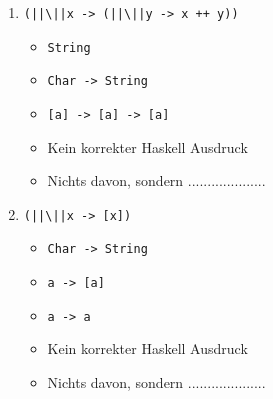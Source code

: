 \documentclass{article}
\begin{document}
\begin{enumerate} [label={\alph*)}]
    \item \begin{verbatim}
(||\||x -> (||\||y -> x ++ y))
          \end{verbatim}

    \begin{itemize}[label=$\square$]
        \item \begin{verbatim}
String
              \end{verbatim}
        \item \begin{verbatim}
Char -> String
              \end{verbatim}
        \item \begin{verbatim}
[a] -> [a] -> [a]
              \end{verbatim}
        \item Kein korrekter Haskell Ausdruck
        \item Nichts davon, sondern ....................
    \end{itemize}

    \item \begin{verbatim}
(||\||x -> [x])
          \end{verbatim}

    \begin{itemize}[label=$\square$]
        \item \begin{verbatim}
Char -> String
              \end{verbatim}
        \item \begin{verbatim}
a -> [a]
              \end{verbatim}
        \item \begin{verbatim}
a -> a
              \end{verbatim}
        \item Kein korrekter Haskell Ausdruck
        \item Nichts davon, sondern ....................
    \end{itemize}
\end{enumerate}
\end{document}
